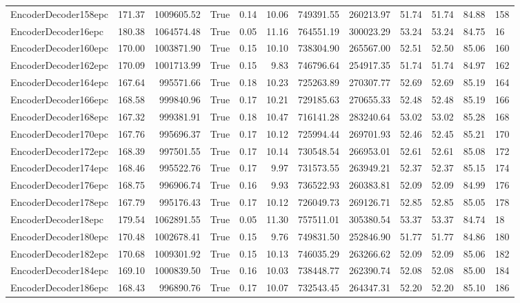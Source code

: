 \begin{tabular}{lrrlrrrrrrrl}
EncoderDecoder158epc & 171.37 & 1009605.52 & True & 0.14 & 10.06 & 749391.55 & 260213.97 & 51.74 & 51.74 & 84.88 & 158 \\
EncoderDecoder16epc & 180.38 & 1064574.48 & True & 0.05 & 11.16 & 764551.19 & 300023.29 & 53.24 & 53.24 & 84.75 & 16 \\
EncoderDecoder160epc & 170.00 & 1003871.90 & True & 0.15 & 10.10 & 738304.90 & 265567.00 & 52.51 & 52.50 & 85.06 & 160 \\
EncoderDecoder162epc & 170.09 & 1001713.99 & True & 0.15 & 9.83 & 746796.64 & 254917.35 & 51.74 & 51.74 & 84.97 & 162 \\
EncoderDecoder164epc & 167.64 & 995571.66 & True & 0.18 & 10.23 & 725263.89 & 270307.77 & 52.69 & 52.69 & 85.19 & 164 \\
EncoderDecoder166epc & 168.58 & 999840.96 & True & 0.17 & 10.21 & 729185.63 & 270655.33 & 52.48 & 52.48 & 85.19 & 166 \\
EncoderDecoder168epc & 167.32 & 999381.91 & True & 0.18 & 10.47 & 716141.28 & 283240.64 & 53.02 & 53.02 & 85.28 & 168 \\
EncoderDecoder170epc & 167.76 & 995696.37 & True & 0.17 & 10.12 & 725994.44 & 269701.93 & 52.46 & 52.45 & 85.21 & 170 \\
EncoderDecoder172epc & 168.39 & 997501.55 & True & 0.17 & 10.14 & 730548.54 & 266953.01 & 52.61 & 52.61 & 85.08 & 172 \\
EncoderDecoder174epc & 168.46 & 995522.76 & True & 0.17 & 9.97 & 731573.55 & 263949.21 & 52.37 & 52.37 & 85.15 & 174 \\
EncoderDecoder176epc & 168.75 & 996906.74 & True & 0.16 & 9.93 & 736522.93 & 260383.81 & 52.09 & 52.09 & 84.99 & 176 \\
EncoderDecoder178epc & 167.79 & 995176.43 & True & 0.17 & 10.12 & 726049.73 & 269126.71 & 52.85 & 52.85 & 85.05 & 178 \\
EncoderDecoder18epc & 179.54 & 1062891.55 & True & 0.05 & 11.30 & 757511.01 & 305380.54 & 53.37 & 53.37 & 84.74 & 18 \\
EncoderDecoder180epc & 170.48 & 1002678.41 & True & 0.15 & 9.76 & 749831.50 & 252846.90 & 51.77 & 51.77 & 84.86 & 180 \\
EncoderDecoder182epc & 170.68 & 1009301.92 & True & 0.15 & 10.13 & 746035.29 & 263266.62 & 52.09 & 52.09 & 85.06 & 182 \\
EncoderDecoder184epc & 169.10 & 1000839.50 & True & 0.16 & 10.03 & 738448.77 & 262390.74 & 52.08 & 52.08 & 85.00 & 184 \\
EncoderDecoder186epc & 168.43 & 996890.76 & True & 0.17 & 10.07 & 732543.45 & 264347.31 & 52.20 & 52.20 & 85.10 & 186 \\

\end{tabular}
